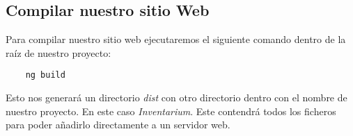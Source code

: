 \subsection{Compilar nuestro sitio Web}
Para compilar nuestro sitio web ejecutaremos el siguiente comando dentro de la raíz de nuestro proyecto:
\begin{verbatim}
    ng build
\end{verbatim}
Esto nos generará un directorio \textit{dist} con otro directorio dentro con el nombre de nuestro proyecto. En este caso \textit{Inventarium}. Este contendrá todos los ficheros para poder añadirlo directamente a un servidor web.